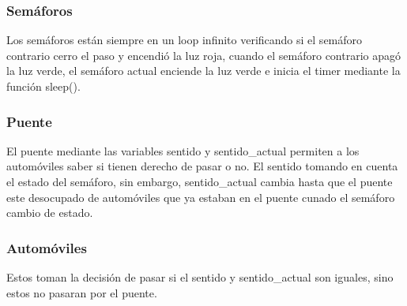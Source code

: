 \documentclass[16pt,a4papper]{article}
\begin{document}
	\subsubsection{Semáforos}
	Los semáforos están siempre en un loop infinito verificando si el semáforo contrario cerro el paso y encendió la luz roja, cuando el semáforo contrario apagó la luz verde, el semáforo actual enciende la luz verde e inicia el timer mediante la función sleep().
	
	\subsubsection{Puente}
	El puente mediante las variables sentido y sentido\_actual permiten a los automóviles saber si tienen derecho de pasar o no. El sentido tomando en cuenta el estado del semáforo, sin embargo, sentido\_actual cambia hasta que el puente este desocupado de automóviles que ya estaban en el puente cunado el semáforo cambio de estado.
	
	\subsubsection{Automóviles}
	Estos toman la decisión de pasar si el sentido y sentido\_actual son iguales, sino estos no pasaran por el puente.

	\newpage
	\printbibliography
	
	
\end{document}
